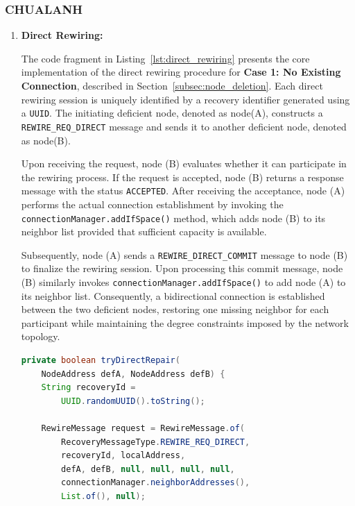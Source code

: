 \subsubsection{CHUALANH}
\label{subsubsec:node_deletion_code}
\begin{enumerate}
  \item{\textbf{Direct Rewiring: }}

        The code fragment in Listing~\ref{lst:direct_rewiring} presents the core implementation of the direct rewiring
        procedure for \textbf{Case 1: No Existing Connection}, described in Section~\ref{subsec:node_deletion}. Each direct
        rewiring session is uniquely identified by a recovery identifier generated using a \texttt{UUID}. The initiating
        deficient node, denoted as node(A), constructs a \texttt{REWIRE\_REQ\_DIRECT} message and sends it to another deficient
        node, denoted as node(B).

        Upon receiving the request, node (B) evaluates whether it can participate in the rewiring process. If the request is
        accepted, node (B) returns a response message with the status \texttt{ACCEPTED}. After receiving the acceptance, node
        (A) performs the actual connection establishment by invoking the \texttt{connectionManager.addIfSpace()} method, which
        adds node (B) to its neighbor list provided that sufficient capacity is available.

        Subsequently, node (A) sends a \texttt{REWIRE\_DIRECT\_COMMIT} message to node (B) to finalize the rewiring session.
        Upon processing this commit message, node (B) similarly invokes \texttt{connectionManager.addIfSpace()} to add node (A)
        to its neighbor list. Consequently, a bidirectional connection is established between the two deficient nodes,
        restoring one missing neighbor for each participant while maintaining the degree constraints imposed by the network
        topology.

        \begin{lstlisting}[language=Java,
    caption={Direct Rewiring},
    label={lst:direct_rewiring}]
private boolean tryDirectRepair(
    NodeAddress defA, NodeAddress defB) {
    String recoveryId =
        UUID.randomUUID().toString();

    RewireMessage request = RewireMessage.of(
        RecoveryMessageType.REWIRE_REQ_DIRECT,
        recoveryId, localAddress,
        defA, defB, null, null, null, null,
        connectionManager.neighborAddresses(),
        List.of(), null);


\end{lstlisting}
\end{enumerate}
